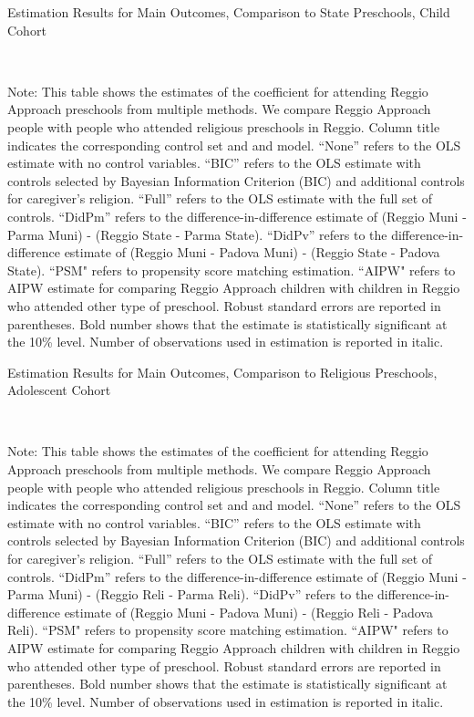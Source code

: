 \begin{table}[H] \caption{Estimation Results for Main Outcomes, Comparison to State Preschools, Child Cohort} \label{ols-M-child-reg-state}
\scalebox{0.8}{}
\vspace{1ex} \\
\footnotesize\raggedright{Note: This table shows the estimates of the coefficient for attending Reggio Approach preschools from multiple methods. We compare Reggio Approach people with people who attended religious preschools in Reggio. Column title indicates the corresponding control set and and model. ``None'' refers to the OLS estimate with no control variables. ``BIC'' refers to the OLS estimate with controls selected by Bayesian Information Criterion (BIC) and additional controls for caregiver's religion. ``Full'' refers to the OLS estimate with the full set of controls. ``DidPm'' refers to the difference-in-difference estimate of (Reggio Muni - Parma Muni) - (Reggio State - Parma State). ``DidPv'' refers to the difference-in-difference estimate of (Reggio Muni - Padova Muni) - (Reggio State - Padova State). ``PSM" refers to propensity score matching estimation. ``AIPW" refers to AIPW estimate for comparing Reggio Approach children with children in Reggio who attended other type of preschool. Robust standard errors are reported in parentheses. Bold number shows that the estimate is statistically significant at the 10\% level. Number of observations used in estimation is reported in italic.}

\end{table}


\begin{table}[H] \caption{Estimation Results for Main Outcomes, Comparison to Religious Preschools, Adolescent Cohort} \label{ols-M-adol-reg-reli}
\scalebox{0.8}{}
\vspace{1ex} \\
\footnotesize\raggedright{Note: This table shows the estimates of the coefficient for attending Reggio Approach preschools from multiple methods. We compare Reggio Approach people with people who attended religious preschools in Reggio. Column title indicates the corresponding control set and and model. ``None'' refers to the OLS estimate with no control variables. ``BIC'' refers to the OLS estimate with controls selected by Bayesian Information Criterion (BIC) and additional controls for caregiver's religion. ``Full'' refers to the OLS estimate with the full set of controls. ``DidPm'' refers to the difference-in-difference estimate of (Reggio Muni - Parma Muni) - (Reggio Reli - Parma Reli). ``DidPv'' refers to the difference-in-difference estimate of (Reggio Muni - Padova Muni) - (Reggio Reli - Padova Reli). ``PSM" refers to propensity score matching estimation. ``AIPW" refers to AIPW estimate for comparing Reggio Approach children with children in Reggio who attended other type of preschool. Robust standard errors are reported in parentheses. Bold number shows that the estimate is statistically significant at the 10\% level. Number of observations used in estimation is reported in italic.}
\end{table}

